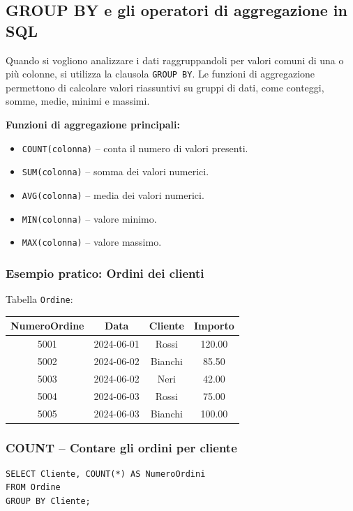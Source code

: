 \documentclass[a4paper,12pt]{article}
\newcommand{\code}[1]{\texttt{#1}}
\begin{document}
\subsection{GROUP BY e gli operatori di aggregazione in SQL}

Quando si vogliono analizzare i dati raggruppandoli per valori comuni di una o più colonne, si utilizza la clausola \code{GROUP BY}.  
Le funzioni di aggregazione permettono di calcolare valori riassuntivi su gruppi di dati, come conteggi, somme, medie, minimi e massimi.

\bigskip
\textbf{Funzioni di aggregazione principali:}
\begin{itemize}
    \item \code{COUNT(colonna)} -- conta il numero di valori presenti.
    \item \code{SUM(colonna)} -- somma dei valori numerici.
    \item \code{AVG(colonna)} -- media dei valori numerici.
    \item \code{MIN(colonna)} -- valore minimo.
    \item \code{MAX(colonna)} -- valore massimo.
\end{itemize}

\subsubsection*{Esempio pratico: Ordini dei clienti}

Tabella \texttt{Ordine}:
\begin{center}
\begin{tabular}{|c|c|c|c|}
\hline
\textbf{NumeroOrdine} & \textbf{Data} & \textbf{Cliente} & \textbf{Importo} \\
\hline
5001 & 2024-06-01 & Rossi & 120.00 \\
5002 & 2024-06-02 & Bianchi & 85.50 \\
5003 & 2024-06-02 & Neri & 42.00 \\
5004 & 2024-06-03 & Rossi & 75.00 \\
5005 & 2024-06-03 & Bianchi & 100.00 \\
\hline
\end{tabular}
\end{center}

\subsubsection{COUNT -- Contare gli ordini per cliente}
\begin{verbatim}
SELECT Cliente, COUNT(*) AS NumeroOrdini
FROM Ordine
GROUP BY Cliente;
\end{verbatim}
\end{document}
